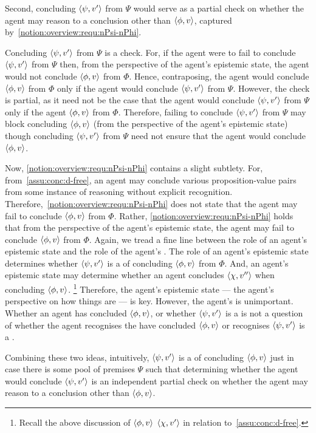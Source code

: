 \begin{note}
  Second, concluding \(\langle \psi, v' \rangle\) from \(\Psi\) would serve as a partial check on whether the agent may reason to a conclusion other than \(\langle \phi, v \rangle\), captured by~\ref{notion:overview:requ:nPsi-nPhi}.

  Concluding \(\langle \psi, v' \rangle\) from \(\Psi\) is a check.
  For, if the agent were to fail to conclude \(\langle \psi, v' \rangle\) from \(\Psi\) then, from the perspective of the agent's epistemic state, the agent would not conclude \(\langle \phi, v \rangle\) from \(\Phi\).
  Hence, contraposing, the agent would conclude \(\langle \phi, v \rangle\) from \(\Phi\) only if the agent would conclude \(\langle \psi, v' \rangle\) from \(\Psi\).
  However, the check is partial, as it need not be the case that the agent would conclude \(\langle \psi, v' \rangle\) from \(\Psi\) only if the agent \(\langle \phi, v \rangle\) from \(\Phi\).
  Therefore, failing to conclude \(\langle \psi, v' \rangle\) from \(\Psi\) may block concluding \(\langle \phi, v \rangle\) (from the perspective of the agent's epistemic state) though concluding \(\langle \psi, v' \rangle\) from \(\Psi\) need not ensure that the agent would conclude \(\langle \phi, v \rangle\).

  Now, \ref{notion:overview:requ:nPsi-nPhi} contains a slight subtlety.
  For, from~\autoref{assu:conc:d-free}, an agent may conclude various proposition-value pairs from some instance of reasoning without explicit recognition.
  Therefore,~\ref{notion:overview:requ:nPsi-nPhi} does not state that the agent may fail to conclude \(\langle \phi, v \rangle\) from \(\Phi\).
  Rather, \ref{notion:overview:requ:nPsi-nPhi} holds that from the perspective of the agent's epistemic state, the agent may fail to conclude \(\langle \phi, v \rangle\) from \(\Phi\).
  Again, we tread a fine line between the role of an agent's epistemic state and the role of the agent's \stance{}.
  The role of an agent's epistemic state determines whether \(\langle \psi, v' \rangle\) is a \requ{} of concluding \(\langle \phi, v \rangle\) from \(\Phi\).
  And, an agent's epistemic state may determine whether an agent concludes \(\langle \chi, v'' \rangle\) when concluding \(\langle \phi, v \rangle\).%
  \footnote{
    Recall the above discussion of \(\langle \phi, v \rangle\) \indicatePr{} \(\langle \chi, v' \rangle\) in relation to~\autoref{assu:conc:d-free}.
  }
  Therefore, the agent's epistemic state --- the agent's perspective on how things are --- is key.
  However, the agent's \stance{} is unimportant.
  Whether an agent has concluded \(\langle \phi, v \rangle\), or whether \(\langle \psi, v' \rangle\) is a \requ{} is not a question of whether the agent recognises the have concluded \(\langle \phi, v \rangle\) or recognises \(\langle \psi, v' \rangle\) is a \requ{}.

  Combining these two ideas, intuitively, \(\langle \psi, v' \rangle\) is a \requ{} of concluding \(\langle \phi, v \rangle\) just in case there is some pool of premises \(\Psi\) such that determining whether the agent would conclude \(\langle \psi, v' \rangle\) is an independent partial check on whether the agent may reason to a conclusion other than \(\langle \phi, v \rangle\).
\end{note}

